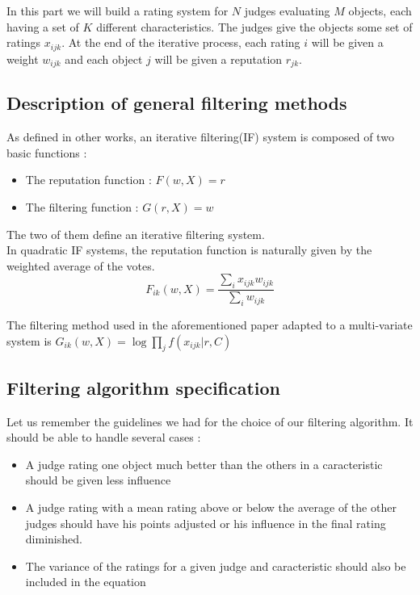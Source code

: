 In this part we will build a rating system for $N$ judges evaluating $M$ objects, each having a set of $K$ different characteristics. 
The judges give the objects some set of ratings $x_{ijk}$.
At the end of the iterative process, each rating $i$ will be given a weight $w_{ijk}$ and each object $j$ will be given a reputation $r_{jk}$.


\subsection*{Description of general filtering methods}
As defined in other works, an iterative filtering(IF) system is composed of two basic functions \cite{Cristo1} : 
\begin{itemize}
\item The reputation function : $F(w,X)=r$
\item The filtering function : $G(r,X)=w$
\end{itemize}
The two of them define an iterative filtering system.\\
In quadratic IF systems, the reputation function is naturally given by the weighted average of the votes.
$$F_{ik}(w,X) = \frac{\sum_{i}x_{ijk}w_{ijk}}{\sum_i w_{ijk}}$$

The filtering method used in the aforementioned paper adapted to a multi-variate system is $G_{ik}(w,X) = \log \prod_j f(x_{ijk}|r,C)$

\subsection*{Filtering algorithm specification}
Let us remember the guidelines we had for the choice of our filtering algorithm. It should be able to handle several cases :
\begin{itemize}
\item A judge rating one object much better than the others in a caracteristic should be given less influence
\item A judge rating with a mean rating above or below the average of the other judges should have his points adjusted or his influence in the final rating diminished.
\item The variance of the ratings for a given judge and caracteristic should also be included in the equation
\end{itemize}

